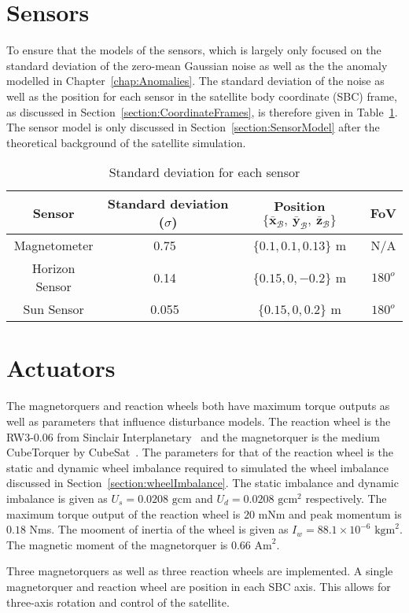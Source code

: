 \section{Sensors}
\label{section:SensorParameters}
To ensure that the models of the sensors, which is largely only focused on the standard deviation of the zero-mean Gaussian noise as well as the the anomaly modelled in Chapter~\ref{chap:Anomalies}. The standard deviation of the noise as well as the position for each sensor in the satellite body coordinate (SBC) frame, as discussed in Section~\ref{section:CoordinateFrames}, is therefore given in Table~\ref{Table:SensorNoise}. The sensor model is only discussed in Section~\ref{section:SensorModel} after the theoretical background of the satellite simulation.
\begin{table}[h!t!b]
	\centering
	\caption{\label{Table:SensorNoise}Standard deviation for each sensor}
	\begin{tabular}{c c c c}
		\hline\hline
		\textbf{Sensor} & Standard deviation ($\sigma$) & Position $\{\bar{\mathbf{x}}_{\mathcal{B}},~\bar{\mathbf{y}}_{\mathcal{B}},~\bar{\mathbf{z}}_{\mathcal{B}}\}$ & FoV\\ \hline
		Magnetometer & 0.75~\cite{MagnetometerAAC} & $\{0.1, 0.1, 0.13\}$ m & N/A\\
		Horizon Sensor & 0.14~\cite{wessels2018infrared} & $\{0.15, 0, -0.2\}$ m & $180^o$\\
		Sun Sensor & 0.055~\cite{SputnixSunSensor} & $\{0.15, 0, 0.2\}$ m & $180^o$\\
		\hline\hline
	\end{tabular}
\end{table}

\section{Actuators}
The magnetorquers and reaction wheels both have maximum torque outputs as well as parameters that influence disturbance models. The reaction wheel is the RW3-0.06 from Sinclair Interplanetary~\cite{reactionWheelSinclair} and the magnetorquer is the medium CubeTorquer by CubeSat~\cite{magnetorquerCubeSpace}. The parameters for that of the reaction wheel is the static and dynamic wheel imbalance required to simulated the wheel imbalance discussed in Section~\ref{section:wheelImbalance}. The static imbalance and dynamic imbalance is given as $U_s = 0.0208\text{ gcm}$ and $U_d = 0.0208\text{ gcm}^2$ respectively. The maximum torque output of the reaction wheel is $\num{20}$ mNm and peak momentum is $\num{0.18}$ Nms. The mooment of inertia of the wheel is given as $I_w = 88.1 \times 10^{-6} \text{ kgm}^2$. The magnetic moment of the magnetorquer is $\num{0.66}\text{ Am}^2$.

Three magnetorquers as well as three reaction wheels are implemented. A single magnetorquer and reaction wheel are position in each SBC axis. This allows for three-axis rotation and control of the satellite.